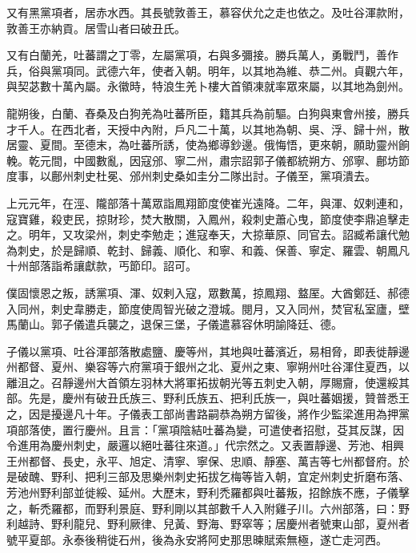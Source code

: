 \begin{pinyinscope}
 又有黑黨項者，居赤水西。其長號敦善王，慕容伏允之走也依之。及吐谷渾款附，敦善王亦納貢。居雪山者曰破丑氏。



 又有白蘭羌，吐蕃謂之丁零，左屬黨項，右與多彌接。勝兵萬人，勇戰鬥，善作兵，俗與黨項同。武德六年，使者入朝。明年，以其地為維、恭二州。貞觀六年，與契苾數十萬內屬。永徽時，特浪生羌卜樓大首領凍就率眾來屬，以其地為劍州。



 龍朔後，白蘭、舂桑及白狗羌為吐蕃所臣，籍其兵為前驅。白狗與東會州接，勝兵才千人。在西北者，天授中內附，戶凡二十萬，以其地為朝、吳、浮、歸十州，散居靈、夏間。至德末，為吐蕃所誘，使為鄉導鈔邊。俄悔悟，更來朝，願助靈州餉輓。乾元間，中國數亂，因寇邠、寧二州，肅宗詔郭子儀都統朔方、邠寧、鄜坊節度事，以鄜州刺史杜冕、邠州刺史桑如圭分二隊出討。子儀至，黨項潰去。



 上元元年，在涇、隴部落十萬眾詣鳳翔節度使崔光遠降。二年，與渾、奴剌連和，寇寶雞，殺吏民，掠財珍，焚大散關，入鳳州，殺刺史蕭心曳，節度使李鼎追擊走之。明年，又攻梁州，刺史李勉走；進寇奉天，大掠華原、同官去。詔臧希讓代勉為刺史，於是歸順、乾封、歸義、順化、和寧、和義、保善、寧定、羅雲、朝鳳凡十州部落詣希讓獻款，丐節印。詔可。



 僕固懷恩之叛，誘黨項、渾、奴剌入寇，眾數萬，掠鳳翔、盩厔。大酋鄭廷、郝德入同州，刺史韋勝走，節度使周智光破之澄城。閱月，又入同州，焚官私室廬，壁馬蘭山。郭子儀遣兵襲之，退保三堡，子儀遣慕容休明諭降廷、德。



 子儀以黨項、吐谷渾部落散處鹽、慶等州，其地與吐蕃濱近，易相脅，即表徙靜邊州都督、夏州、樂容等六府黨項于銀州之北、夏州之東、寧朔州吐谷渾住夏西，以離沮之。召靜邊州大首領左羽林大將軍拓拔朝光等五刺史入朝，厚賜齎，使還綏其部。先是，慶州有破丑氏族三、野利氏族五、把利氏族一，與吐蕃姻援，贊普悉王之，因是擾邊凡十年。子儀表工部尚書路嗣恭為朔方留後，將作少監梁進用為押黨項部落使，置行慶州。且言：「黨項陰結吐蕃為變，可遣使者招慰，芟其反謀，因令進用為慶州刺史，嚴邏以絕吐蕃往來道。」代宗然之。又表置靜邊、芳池、相興王州都督、長史，永平、旭定、清寧、寧保、忠順、靜塞、萬吉等七州都督府。於是破醜、野利、把利三部及思樂州刺史拓拔乞梅等皆入朝，宜定州刺史折磨布落、芳池州野利部並徙綏、延州。大歷末，野利禿羅都與吐蕃叛，招餘族不應，子儀擊之，斬禿羅都，而野利景庭、野利剛以其部數千人入附雞子川。六州部落，曰：野利越詩、野利龍兒、野利厥律、兒黃、野海、野窣等；居慶州者號東山部，夏州者號平夏部。永泰後稍徙石州，後為永安將阿史那思暕賦索無極，遂亡走河西。




\end{pinyinscope}

